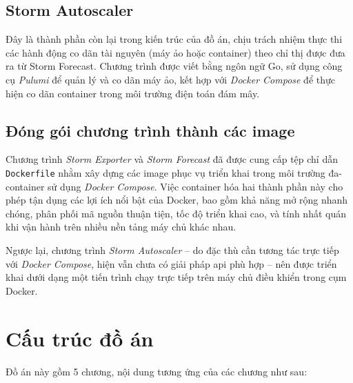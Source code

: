 \subsection{Storm Autoscaler}

Đây là thành phần còn lại trong kiến trúc của đồ án, chịu trách nhiệm thực thi các hành động co dãn tài nguyên (máy ảo hoặc container) theo chỉ thị được đưa ra từ Storm Forecast. Chương trình được viết bằng ngôn ngữ Go, sử dụng công cụ \textit{Pulumi} \autocite{pulumi} để quản lý và co dãn máy ảo, kết hợp với \textit{Docker Compose} để thực hiện co dãn container trong môi trường điện toán đám mây.

\subsection{Đóng gói chương trình thành các image}

Chương trình \textit{Storm Exporter} và \textit{Storm Forecast} đã được cung cấp tệp chỉ dẫn \texttt{Dockerfile} nhằm xây dựng các image phục vụ triển khai trong môi trường đa-container sử dụng \textit{Docker Compose}. Việc container hóa hai thành phần này cho phép tận dụng các lợi ích nổi bật của Docker, bao gồm khả năng mở rộng nhanh chóng, phân phối mã nguồn thuận tiện, tốc độ triển khai cao, và tính nhất quán khi vận hành trên nhiều nền tảng máy chủ khác nhau.

Ngược lại, chương trình \textit{Storm Autoscaler} – do đặc thù cần tương tác trực tiếp với \textit{Docker Compose}, hiện vẫn chưa có giải pháp \acrshort{api} phù hợp – nên được triển khai dưới dạng một tiến trình chạy trực tiếp trên máy chủ điều khiển trong cụm Docker.

\section{Cấu trúc đồ án}

Đồ án này gồm 5 chương, nội dung tương ứng của các chương như sau:

